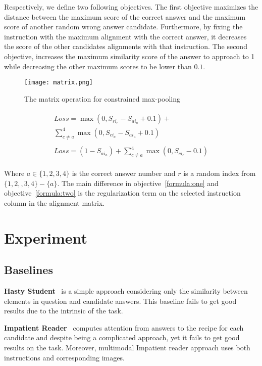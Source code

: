 \documentclass[11pt,a4paper]{article}
\begin{document}
Respectively, we define two following objectives. The first objective maximizes the distance between the maximum score of the correct answer and the maximum score of another random wrong answer candidate. Furthermore, by fixing the instruction with the maximum alignment with the correct answer, it decreases the score of the other candidates alignments with that instruction. The second objective, increases the maximum similarity score of the answer to approach to 1 while decreasing the other maximum scores to be lower than $0.1$. 
\begin{figure}[!h]
    \centering
    \texttt{[image: matrix.png]}
    \caption{The matrix operation for constrained max-pooling}
    \label{fig:approach}
\end{figure}
\begin{align}
    \begin{split}
    \label{formula:one}
        Loss = \max(0, S_{ri_{r}} - S_{ai_{a}} + 0.1)+ \\
        \sum^{4}_{c \neq a}\max(0, S_{ci_{a}} - S_{ai_{a}} + 0.1) 
    \end{split} \\
    \begin{split}
    \label{formula:two}
        Loss = (1 - S_{ai_{a}}) + \sum^{4}_{c \neq a}\max(0, S_{ci_{c}} - 0.1)
    \end{split}
\end{align}

Where $a \in \{1, 2, 3, 4\}$ is the correct answer number and $r$ is a random index from $\{1, 2,, 3, 4\} - \{a\}$. The main difference in objective~\ref{formula:one} and objective~\ref{formula:two} is the regularization term on the selected instruction column in the alignment matrix.

\section{Experiment}
\subsection{Baselines}
\textbf{Hasty Student}~\cite{tapaswi2016movieqa} is a simple approach considering only the similarity between elements in question and candidate answers. This baseline fails to get good results due to the intrinsic of the task.

\noindent \textbf{Impatient Reader}~\cite{hermann2015teaching} computes attention from answers to the recipe for each candidate and despite being a complicated approach, yet it fails to get good results on the task. Moreover, multimodal Impatient reader approach uses both instructions and corresponding images.
\end{document}
